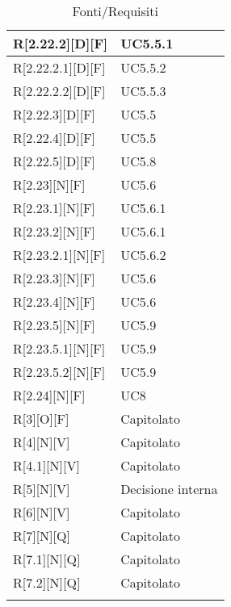 \begin{longtable}{X | X}
\hline
R[2.22.2][D][F] & UC5.5.1 \\
\hline
R[2.22.2.1][D][F] & UC5.5.2 \\
\hline
R[2.22.2.2][D][F] & UC5.5.3 \\
\hline
R[2.22.3][D][F] & UC5.5 \\
\hline
R[2.22.4][D][F] & UC5.5 \\
\hline
R[2.22.5][D][F] & UC5.8 \\
\hline
R[2.23][N][F] & UC5.6 \\
\hline
R[2.23.1][N][F] & UC5.6.1 \\
\hline
R[2.23.2][N][F] & UC5.6.1 \\
\hline
R[2.23.2.1][N][F] & UC5.6.2 \\
\hline
R[2.23.3][N][F] & UC5.6 \\
\hline
R[2.23.4][N][F] & UC5.6 \\
\hline
R[2.23.5][N][F] & UC5.9 \\
\hline
R[2.23.5.1][N][F] & UC5.9 \\
\hline
R[2.23.5.2][N][F] & UC5.9 \\
\hline
R[2.24][N][F] & UC8 \\
\hline
R[3][O][F] & Capitolato \\
\hline
R[4][N][V] & Capitolato \\
\hline
R[4.1][N][V] & Capitolato \\
\hline
R[5][N][V] & Decisione interna \\
\hline
R[6][N][V] & Capitolato \\
\hline
R[7][N][Q] & Capitolato \\
\hline
R[7.1][N][Q] & Capitolato \\
\hline
R[7.2][N][Q] & Capitolato \\
\bottomrule
\caption{Fonti/Requisiti}
\end{longtable}   